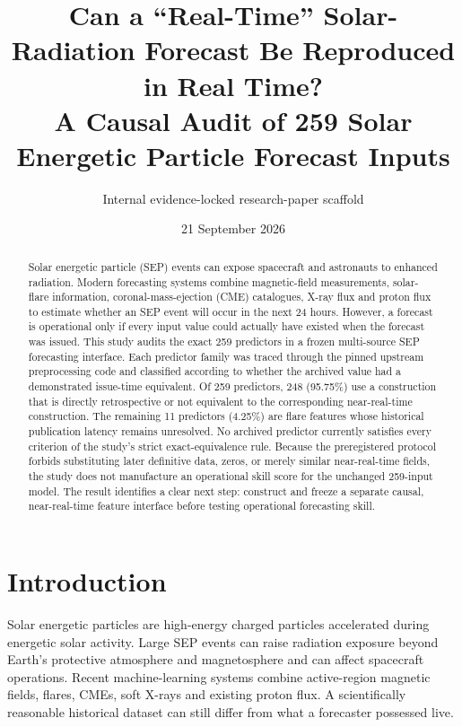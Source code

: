 \documentclass[11pt]{article}
\title{Can a ``Real-Time'' Solar-Radiation Forecast Be Reproduced in Real Time?\\A Causal Audit of 259 Solar Energetic Particle Forecast Inputs}
\author{Internal evidence-locked research-paper scaffold}
\date{21 September 2026}
\begin{document}
\maketitle
\begin{center}\end{center}

\begin{abstract}
Solar energetic particle (SEP) events can expose spacecraft and astronauts to enhanced radiation. Modern forecasting systems combine magnetic-field measurements, solar-flare information, coronal-mass-ejection (CME) catalogues, X-ray flux and proton flux to estimate whether an SEP event will occur in the next 24 hours. However, a forecast is operational only if every input value could actually have existed when the forecast was issued. This study audits the exact 259 predictors in a frozen multi-source SEP forecasting interface. Each predictor family was traced through the pinned upstream preprocessing code and classified according to whether the archived value had a demonstrated issue-time equivalent. Of 259 predictors, 248 (95.75\%) use a construction that is directly retrospective or not equivalent to the corresponding near-real-time construction. The remaining 11 predictors (4.25\%) are flare features whose historical publication latency remains unresolved. No archived predictor currently satisfies every criterion of the study's strict exact-equivalence rule. Because the preregistered protocol forbids substituting later definitive data, zeros, or merely similar near-real-time fields, the study does not manufacture an operational skill score for the unchanged 259-input model. The result identifies a clear next step: construct and freeze a separate causal, near-real-time feature interface before testing operational forecasting skill.
\end{abstract}

\section{Introduction}
Solar energetic particles are high-energy charged particles accelerated during energetic solar activity. Large SEP events can raise radiation exposure beyond Earth's protective atmosphere and magnetosphere and can affect spacecraft operations. Recent machine-learning systems combine active-region magnetic fields, flares, CMEs, soft X-rays and existing proton flux. A scientifically reasonable historical dataset can still differ from what a forecaster possessed live.
\end{document}

